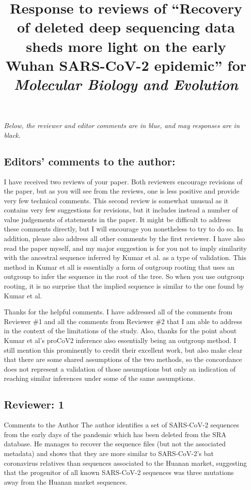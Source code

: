 \documentclass[11pt, oneside]{article}   	%
\title{Response to reviews of ``Recovery of deleted deep sequencing data sheds more light on the early Wuhan SARS-CoV-2 epidemic'' for \textit{Molecular Biology and Evolution}}
\author{}
\newcommand{\response}[1]{{\color{black}#1}}
\begin{document}
\maketitle

\emph{Below, the reviewer and editor comments {\color{blue} are in blue}, and may responses are in black.}

\color{blue}

\subsection*{Editors’ comments to the author:}

I have received two reviews of your paper.  Both reviewers encourage revisions of the paper, but as you will see from the reviews, one is less positive and provide very few technical comments.  This second review is somewhat unusual as it contains very few suggestions for revisions, but it includes instead a number of value judgements of statements in the paper.  It might be difficult to address these comments directly, but I will encourage you nonetheless to try to do so.  In addition, please also address all other comments by the first reviewer.  I have also read the paper myself, and my major suggestion is for you not to imply similarity with the ancestral sequence inferred by Kumar et al. as a type of validation.  This method in Kumar et all is essentially a form of outgroup rooting that uses an outgroup to infer the sequence in the root of the tree.  So when you use outgroup rooting, it is no surprise that the implied sequence is similar to the one found by Kumar et al.

\response{Thanks for the helpful comments. I have addressed all of the comments from Reviewer \#1 and all the comments from Reviewer \#2 that I am able to address in the context of the limitations of the study. Also, thanks for the point about Kumar et al's proCoV2 inference also essentially being an outgroup method. I still mention this prominently to credit their excellent work, but also make clear that there are some shared assumptions of the two methods, so the concordance does not represent a validation of those assumptions but only an indication of reaching similar inferences under some of the same assumptions.}

\subsection*{Reviewer: 1}

Comments to the Author
The author identifies a set of SARS-CoV-2 sequences from the early days of the pandemic which has been deleted from the SRA database. He manages to recover the sequence files (but not the associated metadata) and shows that they are more similar to SARS-CoV-2's bat coronavirus relatives than sequences associated to the Huanan market, suggesting that the progenitor of all known SARS-CoV-2 sequences was three mutations away from the Huanan market sequences.
\end{document}
